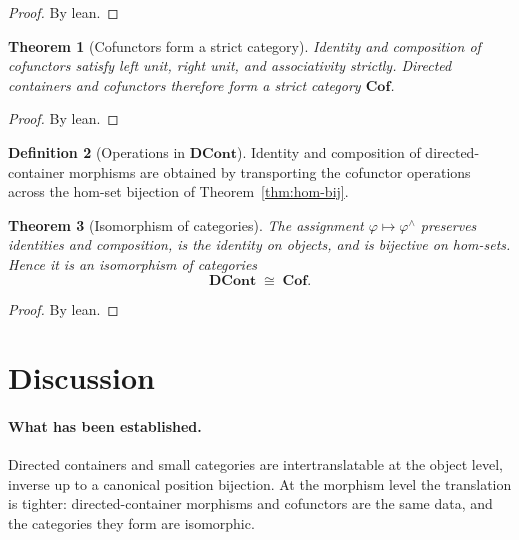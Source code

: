 \documentclass[11pt,a4paper]{article}
\theoremstyle{plain}
\newtheorem{theorem}{Theorem}[section]
\theoremstyle{definition}
\newtheorem{definition}[theorem]{Definition}
\newcommand{\DCont}{\mathbf{DCont}}
\newcommand{\Cof}{\mathbf{Cof}}
\begin{document}
\begin{proof}
By lean.
\end{proof}

\begin{theorem}[Cofunctors form a strict category]\label{thm:cof-cat}
Identity and composition of cofunctors satisfy left unit, right unit, and
associativity strictly. Directed containers and cofunctors therefore form a
strict category $\Cof$.
\end{theorem}

\begin{proof}
By lean.
\end{proof}

\begin{definition}[Operations in $\DCont$]\label{def:dcont-ops}
Identity and composition of directed-container morphisms are obtained by
transporting the cofunctor operations across the hom-set bijection of
Theorem~\ref{thm:hom-bij}.
\end{definition}

\begin{theorem}[Isomorphism of categories]\label{thm:iso}
The assignment $\varphi\mapsto\varphi^\wedge$ preserves identities and
composition, is the identity on objects, and is bijective on hom-sets.
Hence it is an isomorphism of categories
\begin{equation}
  \DCont \;\cong\; \Cof.
\end{equation}
\end{theorem}

\begin{proof}
By lean.
\end{proof}

\section{Discussion}

\paragraph{What has been established.}
Directed containers and small categories are intertranslatable at the object
level, inverse up to a canonical position bijection. At the morphism level the
translation is tighter: directed-container morphisms and cofunctors are the
same data, and the categories they form are isomorphic.
\end{document}
